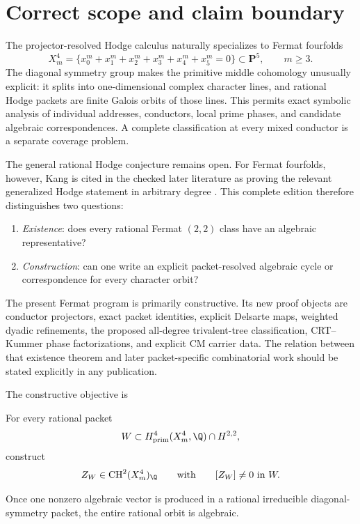 
\chapter{Correct scope and claim boundary}
The projector-resolved Hodge calculus naturally specializes to Fermat fourfolds
\[
X_m^4=\{x_0^m+x_1^m+x_2^m+x_3^m+x_4^m+x_5^m=0\}\subset\mathbf P^5,
\qquad m\ge 3.
\]
The diagonal symmetry group makes the primitive middle cohomology unusually explicit: it splits into one-dimensional complex character lines, and rational Hodge packets are finite Galois orbits of those lines. This permits exact symbolic analysis of individual addresses, conductors, local prime phases, and candidate algebraic correspondences. A complete classification at every mixed conductor is a separate coverage problem.

\begin{claimboundary}
The general rational Hodge conjecture remains open. For Fermat fourfolds, however, Kang is cited in the checked later literature as proving the relevant generalized Hodge statement in arbitrary degree \cite{KangFermat}. This complete edition therefore distinguishes two questions:
\begin{enumerate}
\item \emph{Existence}: does every rational Fermat $(2,2)$ class have an algebraic representative?
\item \emph{Construction}: can one write an explicit packet-resolved algebraic cycle or correspondence for every character orbit?
\end{enumerate}
The present Fermat program is primarily constructive. Its new proof objects are conductor projectors, exact packet identities, explicit Delsarte maps, weighted dyadic refinements, the proposed all-degree trivalent-tree classification, CRT--Kummer phase factorizations, and explicit CM carrier data. The relation between that existence theorem and later packet-specific combinatorial work should be stated explicitly in any publication.
\end{claimboundary}



The constructive objective is
\begin{resultbox}
For every rational packet
\[
W\subset H^4_{\mathrm{prim}}(X_m^4,\Q)\cap H^{2,2},
\]
construct
\[
Z_W\in\CH^2(X_m^4)_\Q
\qquad\text{with}\qquad
[Z_W]\ne0\text{ in }W.
\]
\end{resultbox}
Once one nonzero algebraic vector is produced in a rational irreducible diagonal-symmetry packet, the entire rational orbit is algebraic.

